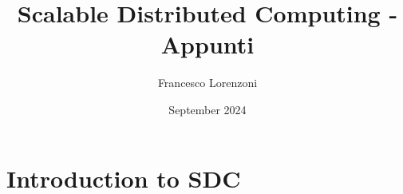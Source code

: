 

\title{Scalable Distributed Computing - Appunti}
\author{Francesco Lorenzoni}
\date{September 2024}


\makeatletter
\renewcommand{\l@section}{\@dottedtocline{1}{1.5em}{2.6em}}
\renewcommand{\l@subsection}{\@dottedtocline{2}{2.5em}{3.6em}}
\renewcommand{\l@subsubsection}{\@dottedtocline{3}{3.5em}{4.5em}}
\makeatother
{} %



\doparttoc[n]

\maketitle
\tableofcontents

\part{Introduction to SDC}
\parttoc












